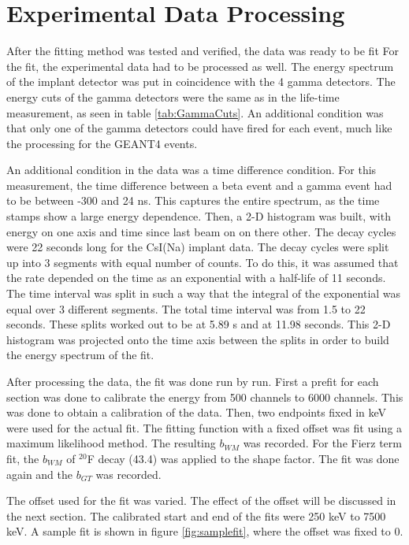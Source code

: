 \documentclass[../MaxHughesThesis.tex]{subfiles}
\begin{document}
\section{Experimental Data Processing}
After the fitting method was tested and verified, the data was ready to be fit 
For the fit, the experimental data had to be processed as well. 
The energy spectrum of the implant detector was put in coincidence with the 4 gamma detectors.
The energy cuts of the gamma detectors were the same as in the life-time measurement, as seen in table \ref{tab:GammaCuts}.
An additional condition was that only one of the gamma detectors could have fired for each event, much like the processing for the GEANT4 events.

An additional condition in the data was a time difference condition.
For this measurement, the time difference between a beta event and a gamma event had to be between -300 and 24 ns.
This captures the entire spectrum, as the time stamps show a large energy dependence. 
Then, a 2-D histogram was built, with energy on one axis and time since last beam on on there other.
The decay cycles were 22 seconds long for the CsI(Na) implant data. 
The decay cycles were split up into 3 segments with equal number of counts.
To do this, it was assumed that the rate depended on the time as an exponential with a half-life of 11 seconds.
The time interval was split in such a way that the integral of the exponential was equal over 3 different segments.
The total time interval was from 1.5 to 22 seconds.
These splits worked out to be at 5.89 s and at 11.98 seconds. 
This 2-D histogram was projected onto the time axis between the splits in order to build the energy spectrum of the fit. 

After processing the data, the fit was done run by run.
First a prefit for each section was done to calibrate the energy from 500 channels to 6000 channels.
This was done to obtain a calibration of the data.
Then, two endpoints fixed in keV were used for the actual fit.
The fitting function with a fixed offset was fit using a maximum likelihood method.
The resulting $b_{WM}$ was recorded.
For the Fierz term fit, the $b_{WM}$ of $^{20}$F decay (43.4) was applied to the shape factor.
The fit was done again and the $b_{GT}$ was recorded.

The offset used for the fit was varied.
The effect of the offset will be discussed in the next section. 
The calibrated start and end of the fits were 250 keV to 7500 keV. 
A sample fit is shown in figure \ref{fig:samplefit}, where the offset was fixed to 0.
\end{document}
